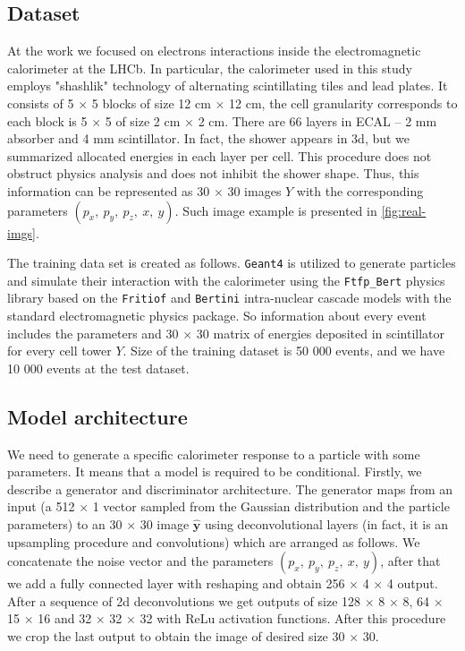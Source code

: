 \documentclass{webofc}
\begin{document}
\subsection{Dataset}
At the work we focused on electrons interactions inside the electromagnetic calorimeter at the LHCb. In particular, the calorimeter used in this study employs "shashlik" technology of alternating scintillating tiles and lead plates. It consists of 5 $\times$ 5 blocks of size 12 cm $\times$ 12 cm, the cell granularity corresponds to each block is 5 $\times$ 5 of size 2 cm $\times$ 2 cm. There are 66 layers in ECAL -- 2 mm absorber and 4 mm scintillator. In fact, the shower appears in 3d, but we summarized allocated energies in each layer per cell. This procedure does not obstruct physics analysis and does not inhibit the shower shape. Thus, this information can be represented as 30 $\times$ 30 images $Y$ with the corresponding parameters $(p_x,~ p_y,~ p_z,~ x,~ y)$. Such image example is presented in \ref{fig:real-imgs}.

The training data set is created as follows. \texttt{Geant4} is utilized to generate particles and simulate their interaction with the calorimeter using the \texttt{Ftfp\_Bert} physics library based on the \texttt{Fritiof}  and \texttt{Bertini} intra-nuclear cascade models with the standard electromagnetic physics package. So information about every event includes the parameters and 30 $\times$ 30 matrix of energies deposited in scintillator for every cell tower $Y$. Size of the training dataset is 50 000 events, and we have 10 000 events at the test dataset.

\subsection{Model architecture}

We need to generate a specific calorimeter response to a particle with some parameters. It means that a model is required to be conditional.
Firstly, we describe a generator and discriminator architecture. The generator maps from an input (a 512 $\times$ 1 vector sampled from the Gaussian distribution and the particle parameters) to an 30 $\times$ 30 image $\hat{\textbf{y}}$ using deconvolutional layers (in fact, it is an upsampling procedure and convolutions) which are arranged as follows. We concatenate the noise vector and the parameters $(p_x,~ p_y,~ p_z,~ x,~ y)$, after that we add a fully connected layer with reshaping and obtain 256 $\times$ 4 $\times$ 4 output. After a sequence of 2d deconvolutions we get outputs of size  128 $\times$ 8 $\times$ 8, 64 $\times$ 15 $\times$ 16 and 32 $\times$ 32 $\times$ 32  with ReLu activation functions. After this procedure we crop the last output to obtain the image of desired size 30 $\times$ 30.
\end{document}
